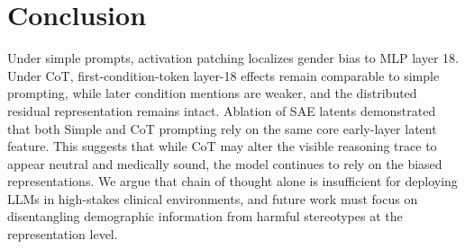 \documentclass{article}
\begin{document}
\section{Conclusion}
Under simple prompts, activation patching localizes gender bias to MLP layer 18. Under CoT, first-condition-token layer-18 effects remain comparable to simple prompting, while later condition mentions are weaker, and the distributed residual representation remains intact. Ablation of SAE latents demonstrated that both Simple and CoT prompting rely on the same core early-layer latent feature. This suggests that while CoT may alter the visible reasoning trace to appear neutral and medically sound, the model continues to rely on the biased representations. We argue that chain of thought alone is insufficient for deploying LLMs in high-stakes clinical environments, and future work must focus on disentangling demographic information from harmful stereotypes at the representation level.
\end{document}
